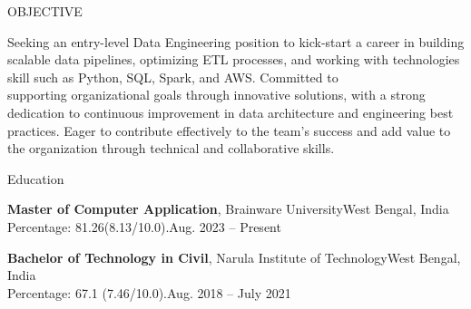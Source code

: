 \documentclass{resume} %
\begin{document}

\begin{rSection}{OBJECTIVE}

{Seeking an entry-level Data Engineering position to kick-start a career in building scalable data pipelines, optimizing ETL processes, and working with technologies skill such as Python, SQL, Spark, and AWS. Committed to \\ supporting organizational goals through innovative solutions, with a strong dedication to continuous improvement in data architecture and engineering best practices. Eager to contribute effectively to the team’s success and add value to the organization through technical and collaborative skills.}


\end{rSection}

\begin{rSection}{Education}

{\bf Master of Computer Application}, Brainware University\hfill West Bengal, India \\
Percentage: 81.26(8.13/10.0).\hfill {Aug. 2023 -- Present}


{\bf Bachelor of Technology in Civil}, Narula Institute of Technology\hfill West Bengal, India \\
Percentage: 67.1 (7.46/10.0).\hfill {Aug. 2018 -- July 2021}


\end{rSection}
\end{document}
